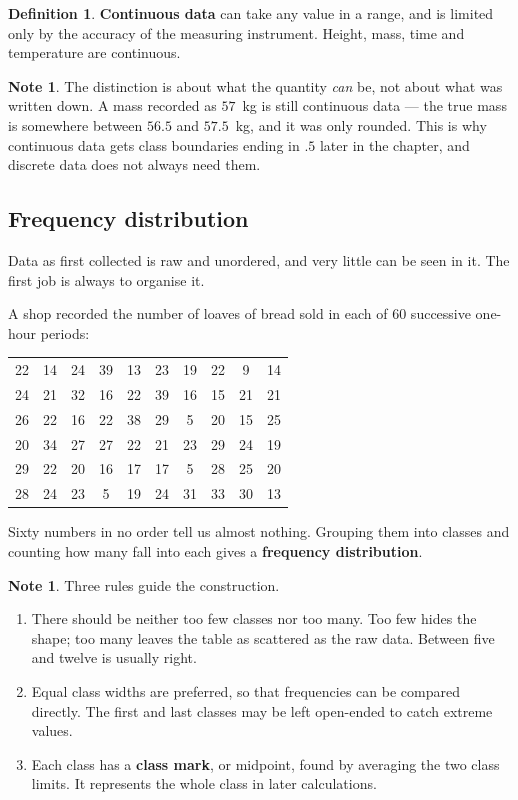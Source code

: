 \documentclass[11pt,a4paper]{article}
\theoremstyle{definition}
\newtheorem{definition}[thm]{Definition}
\newtheorem{note}[thm]{Note}
\begin{document}
\begin{definition}
\textbf{Continuous data} can take any value in a range, and is limited only by the
accuracy of the measuring instrument. Height, mass, time and temperature are continuous.
\end{definition}

\begin{note}
The distinction is about what the quantity \emph{can} be, not about what was written
down. A mass recorded as $57$~kg is still continuous data --- the true mass is somewhere
between $56.5$ and $57.5$~kg, and it was only rounded. This is why continuous data gets
class boundaries ending in $.5$ later in the chapter, and discrete data does not always
need them.
\end{note}

\subsection{Frequency distribution}

Data as first collected is raw and unordered, and very little can be seen in it. The
first job is always to organise it.

A shop recorded the number of loaves of bread sold in each of $60$ successive one-hour
periods:

\begin{table}[H]
\centering
\begin{tabular}{cccccccccc}
22 & 14 & 24 & 39 & 13 & 23 & 19 & 22 & 9 & 14\\
24 & 21 & 32 & 16 & 22 & 39 & 16 & 15 & 21 & 21\\
26 & 22 & 16 & 22 & 38 & 29 & 5 & 20 & 15 & 25\\
20 & 34 & 27 & 27 & 22 & 21 & 23 & 29 & 24 & 19\\
29 & 22 & 20 & 16 & 17 & 17 & 5 & 28 & 25 & 20\\
28 & 24 & 23 & 5 & 19 & 24 & 31 & 33 & 30 & 13\\
\end{tabular}
\end{table}

Sixty numbers in no order tell us almost nothing. Grouping them into classes and
counting how many fall into each gives a \textbf{frequency distribution}.

\begin{note}
Three rules guide the construction.
\begin{enumerate}
\item[(i).] There should be neither too few classes nor too many. Too few hides the
shape; too many leaves the table as scattered as the raw data. Between five and twelve
is usually right.
\item[(ii).] Equal class widths are preferred, so that frequencies can be compared
directly. The first and last classes may be left open-ended to catch extreme values.
\item[(iii).] Each class has a \textbf{class mark}, or midpoint, found by averaging the
two class limits. It represents the whole class in later calculations.
\end{enumerate}
\end{note}
\end{document}
